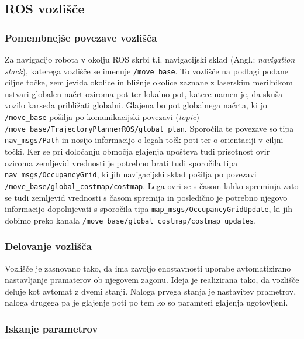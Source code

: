 \documentclass[10pt,a4paper]{article}
\begin{document}
\subsection{ROS vozlišče}

\subsubsection{Pomembnejše povezave vozlišča}


Za navigacijo robota v okolju ROS skrbi t.i. navigacijski sklad (Angl.: \textit{navigation stack}), katerega vozlišče se imenuje \texttt{/move\_base}. To vozlišče na podlagi podane ciljne točke, zemljevida okolice in bližnje okolice zaznane z laserskim merilnikom ustvari globalen načrt oziroma pot ter lokalno pot, katere namen je, da skuša vozilo karseda približati globalni. Glajena bo pot globalnega načrta, ki jo \texttt{/move\_base} pošilja po komunikacijski povezavi (\textit{topic}) \texttt{/move\_base/TrajectoryPlannerROS/global\_plan}. Sporočila te povezave so tipa \texttt{nav\_msgs/Path} in nosijo informacijo o legah točk poti ter o orientaciji v ciljni točki. Ker se pri določanju območja glajenja upošteva tudi prisotnost ovir oziroma zemljevid vrednosti je potrebno brati tudi sporočila tipa \texttt{nav\_msgs/OccupancyGrid}, ki jih navigacijski sklad pošilja po povezavi \texttt{/move\_base/global\_costmap/costmap}. Lega ovri se s časom lahko spreminja zato se tudi zemljevid vrednosti s časom spremija in posledično je potrebno njegovo informacijo dopolnjevati s sporočila tipa \texttt{map\_msgs/OccupancyGridUpdate}, ki jih dobimo preko kanala \newline
\texttt{/move\_base/global\_costmap/costmap\_updates}.

\subsubsection{Delovanje vozlišča}

Vozlišče je zasnovano tako, da ima zavoljo enostavnosti uporabe avtomatizirano nastavljanje pramaterov ob njegovem zagonu. Ideja je realizirana tako, da vozlišče deluje kot avtomat z dvemi stanji. Naloga prvega stanja je nastavitev prametrov, naloga drugega pa je glajenje poti po tem ko so paramteri glajenja ugotovljeni.

\subsubsection{Iskanje parametrov}
\end{document}
